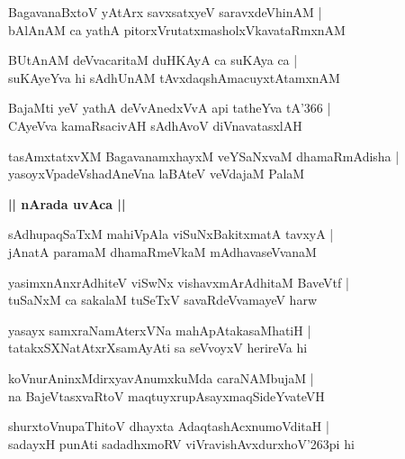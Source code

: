 \documentclass[twoside,12pt,openright]{book}
\def\S{\char'263}
\newcounter{shloka}[chapter]
\def\uvaca#1{\centerline{{\large\textbf{#1}}}}
\begin{document}
\begin{shloka}%
BagavanaBxtoV yAtArx savxsatxyeV saravxdeVhinAM |\\
bAlAnAM ca yathA pitorxVrutatxmasholxVkavataRmxnAM 
\end{shloka}

\begin{shloka}%
BUtAnAM deVvacaritaM duHKAyA ca suKAya ca |\\
suKAyeYva hi sAdhUnAM tAvxdaqshAmacuyxtAtamxnAM 
\end{shloka}

\begin{shloka}%
BajaMti yeV yathA deVvAnedxVvA api tatheYva tA\char'366 |\\
CAyeVva kamaRsacivAH sAdhAvoV diVnavatasxlAH 
\end{shloka}

\begin{shloka}%
tasAmxtatxvXM BagavanamxhayxM veYSaNxvaM dhamaRmAdisha |\\
yasoyxVpadeVshadAneVna laBAteV veVdajaM PalaM
\end{shloka}

\uvaca{|| nArada uvAca ||}

\begin{shloka}%
sAdhupaqSaTxM mahiVpAla viSuNxBakitxmatA tavxyA |\\
jAnatA paramaM dhamaRmeVkaM mAdhavaseVvanaM 
\end{shloka}

\begin{shloka}%
yasimxnAnxrAdhiteV viSwNx vishavxmArAdhitaM BaveVtf |\\
tuSaNxM ca sakalaM tuSeTxV savaRdeVvamayeV harw 
\end{shloka}

\begin{shloka}%
yasayx samxraNamAterxVNa mahApAtakasaMhatiH |\\
tatakxSXNatAtxrXsamAyAti sa seVvoyxV herireVa hi 
\end{shloka}

\begin{shloka}%
koVnurAninxMdirxyavAnumxkuMda caraNAMbujaM |\\
na BajeVtasxvaRtoV maqtuyxrupAsayxmaqSideYvateVH
\end{shloka}

\begin{shloka}%
shurxtoVnupaThitoV dhayxta AdaqtashAcxnumoVditaH |\\
sadayxH punAti sadadhxmoRV viVravishAvxdurxhoV\S pi hi 
\end{shloka}
\end{document}
